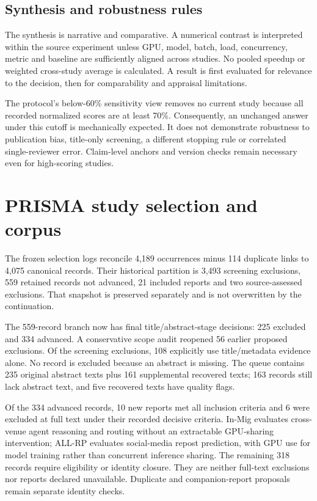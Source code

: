 \subsection{Synthesis and robustness rules}
The synthesis is narrative and comparative. A numerical contrast is interpreted within the source experiment unless GPU, model, batch, load, concurrency, metric and baseline are sufficiently aligned across studies. No pooled speedup or weighted cross-study average is calculated. A result is first evaluated for relevance to the decision, then for comparability and appraisal limitations.

The protocol's below-60\% sensitivity view removes no current study because all recorded normalized scores are at least 70\%. Consequently, an unchanged answer under this cutoff is mechanically expected. It does not demonstrate robustness to publication bias, title-only screening, a different stopping rule or correlated single-reviewer error. Claim-level anchors and version checks remain necessary even for high-scoring studies.

\section{PRISMA study selection and corpus}
The frozen selection logs reconcile 4,189 occurrences minus 114 duplicate links to 4,075 canonical records. Their historical partition is 3,493 screening exclusions, 559 retained records not advanced, 21 included reports and two source-assessed exclusions. That snapshot is preserved separately and is not overwritten by the continuation.

The 559-record branch now has final title/abstract-stage decisions: 225 excluded and 334 advanced. A conservative scope audit reopened 56 earlier proposed exclusions. Of the screening exclusions, 108 explicitly use title/metadata evidence alone. No record is excluded because an abstract is missing. The queue contains 235 original abstract texts plus 161 supplemental recovered texts; 163 records still lack abstract text, and five recovered texts have quality flags.

Of the 334 advanced records, 10 new reports met all inclusion criteria and 6 were excluded at full text under their recorded decisive criteria. In-Mig evaluates cross-venue agent reasoning and routing without an extractable GPU-sharing intervention; ALL-RP evaluates social-media repost prediction, with GPU use for model training rather than concurrent inference sharing. The remaining 318 records require eligibility or identity closure. They are neither full-text exclusions nor reports declared unavailable. Duplicate and companion-report proposals remain separate identity checks.

